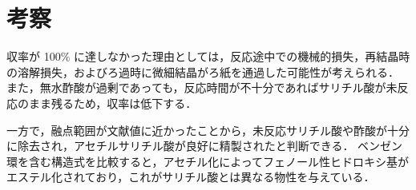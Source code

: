 \section{考察}
収率が 100\% に達しなかった理由としては，反応途中での機械的損失，再結晶時の溶解損失，およびろ過時に微細結晶がろ紙を通過した可能性が考えられる．
また，無水酢酸が過剰であっても，反応時間が不十分であればサリチル酸が未反応のまま残るため，収率は低下する．

一方で，融点範囲が文献値に近かったことから，未反応サリチル酸や酢酸が十分に除去され，アセチルサリチル酸が良好に精製されたと判断できる．
ベンゼン環を含む構造式を比較すると，アセチル化によってフェノール性ヒドロキシ基がエステル化されており，これがサリチル酸とは異なる物性を与えている．